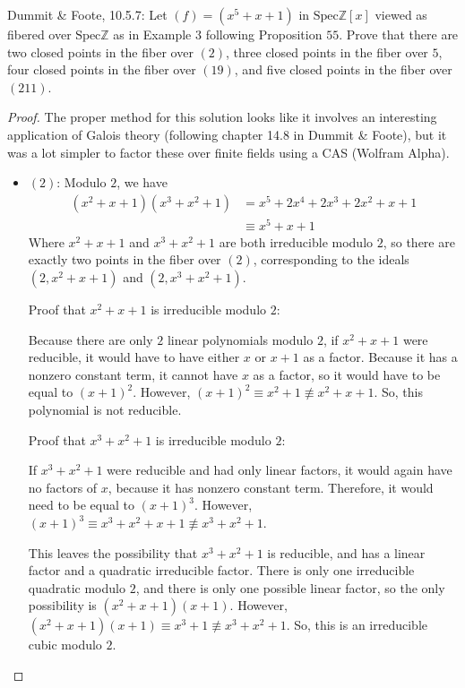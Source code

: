 \documentclass[12pt]{article}
\newcommand{\Z}{\mathbb{Z}}
\theoremstyle{definition}
\newenvironment{problem}[2][Problem]{\begin{trivlist}
\item[\hskip \labelsep {\bfseries #1}\hskip \labelsep {\bfseries #2.}]}{\end{trivlist}}
\begin{document}
\begin{problem}{2}
	Dummit \& Foote, 10.5.7: Let $(f) = (x^5 + x + 1)$ in $\text{Spec}\Z[x]$ viewed as fibered over $\text{Spec}\Z$ as in Example $3$ following Proposition $55$. Prove that there are two closed points in the fiber over $(2)$, three closed points in the fiber over $5$, four closed points in the fiber over $(19)$, and five closed points in the fiber over $(211)$.
	\begin{proof}
		The proper method for this solution looks like it involves an interesting application of Galois theory (following chapter 14.8 in Dummit \& Foote), but it was a lot simpler to factor these over finite fields using a CAS (Wolfram Alpha).
		\begin{itemize}
			\item $(2)$: Modulo $2$, we have
				\begin{align*}
					(x^2 + x + 1)(x^3 + x^2 + 1) &= x^5 + 2x^4 + 2x^3 + 2x^2 + x + 1\\
					&\equiv x^5 + x + 1
				\end{align*}
				Where $x^2 + x + 1$ and $x^3 + x^2 + 1$ are both irreducible modulo $2$, so there are exactly two points in the fiber over $(2)$, corresponding to the ideals $(2, x^2 + x + 1)$ and $(2, x^3 + x^2 + 1)$.
				\par Proof that $x^2 + x + 1$ is irreducible modulo $2$:
				\par Because there are only $2$ linear polynomials modulo $2$, if $x^2 + x + 1$ were reducible, it would have to have either $x$ or $x+1$ as a factor. Because it has a nonzero constant term, it cannot have $x$ as a factor, so it would have to be equal to $(x+1)^2$. However, $(x+1)^2 \equiv x^2 + 1 \not\equiv x^2 + x +1$. So, this polynomial is not reducible.
				\par Proof that $x^3 + x^2 + 1$ is irreducible modulo $2$:
				\par If $x^3 + x^2 + 1$ were reducible and had only linear factors, it would again have no factors of $x$, because it has nonzero constant term. Therefore, it would need to be equal to $(x+1)^3$. However, $(x+1)^3 \equiv x^3 + x^2 + x + 1 \not\equiv x^3 + x^2 + 1$.
				\par This leaves the possibility that $x^3 + x^2 + 1$ is reducible, and has a linear factor and a quadratic irreducible factor. There is only one irreducible quadratic modulo $2$, and there is only one possible linear factor, so the only possibility is $(x^2 + x + 1)(x+1)$. However, $(x^2 + x + 1)(x+1) \equiv x^3 + 1 \not\equiv x^3 + x^2 + 1$. So, this is an irreducible cubic modulo $2$.

\end{itemize}
\end{proof}
\end{problem}
\end{document}
